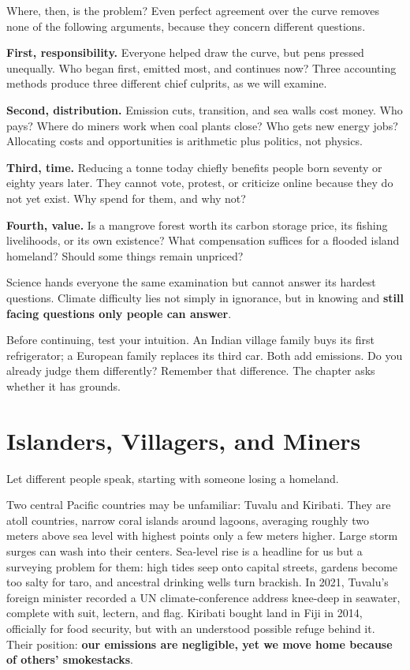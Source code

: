 Where, then, is the problem? Even perfect agreement over the curve removes none of the following arguments, because they concern different questions.

\textbf{First, responsibility.} Everyone helped draw the curve, but pens pressed unequally. Who began first, emitted most, and continues now? Three accounting methods produce three different chief culprits, as we will examine.

\textbf{Second, distribution.} Emission cuts, transition, and sea walls cost money. Who pays? Where do miners work when coal plants close? Who gets new energy jobs? Allocating costs and opportunities is arithmetic plus politics, not physics.

\textbf{Third, time.} Reducing a tonne today chiefly benefits people born seventy or eighty years later. They cannot vote, protest, or criticize online because they do not yet exist. Why spend for them, and why not?

\textbf{Fourth, value.} Is a mangrove forest worth its carbon storage price, its fishing livelihoods, or its own existence? What compensation suffices for a flooded island homeland? Should some things remain unpriced?

Science hands everyone the same examination but cannot answer its hardest questions. Climate difficulty lies not simply in ignorance, but in knowing and \textbf{still facing questions only people can answer}.

Before continuing, test your intuition. An Indian village family buys its first refrigerator; a European family replaces its third car. Both add emissions. Do you already judge them differently? Remember that difference. The chapter asks whether it has grounds.

\section{Islanders, Villagers, and Miners}
Let different people speak, starting with someone losing a homeland.

Two central Pacific countries may be unfamiliar: Tuvalu and Kiribati. They are atoll countries, narrow coral islands around lagoons, averaging roughly two meters above sea level with highest points only a few meters higher. Large storm surges can wash into their centers. Sea-level rise is a headline for us but a surveying problem for them: high tides seep onto capital streets, gardens become too salty for taro, and ancestral drinking wells turn brackish. In 2021, Tuvalu's foreign minister recorded a UN climate-conference address knee-deep in seawater, complete with suit, lectern, and flag. Kiribati bought land in Fiji in 2014, officially for food security, but with an understood possible refuge behind it. Their position: \textbf{our emissions are negligible, yet we move home because of others' smokestacks}.

